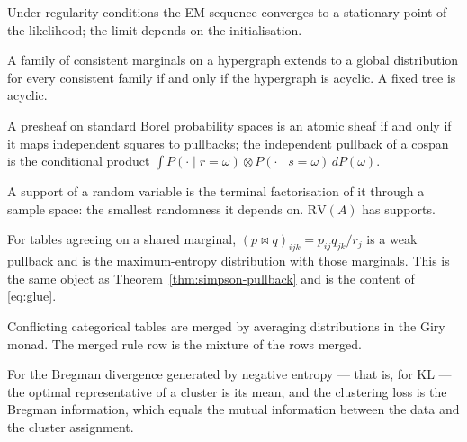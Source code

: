 \begin{theorem}
\label{thm:wu}
Under regularity conditions the EM sequence converges to a stationary point of
the likelihood; the limit depends on the initialisation.
\end{theorem}

\begin{theorem}
\label{thm:vorobev}
A family of consistent marginals on a hypergraph extends to a global
distribution for every consistent family if and only if the hypergraph is
acyclic. A fixed tree is acyclic.
\end{theorem}

\begin{theorem}
\label{thm:simpson-pullback}
A presheaf on standard Borel probability spaces is an atomic sheaf if and only
if it maps independent squares to pullbacks; the independent pullback of a
cospan is the conditional product $\int P(\cdot\mid r{=}\omega)\otimes
P(\cdot\mid s{=}\omega)\,dP(\omega)$.
\end{theorem}

\begin{definition}
\label{def:supports}
A support of a random variable is the terminal factorisation of it through a
sample space: the smallest randomness it depends on. $\mathrm{RV}(A)$ has
supports.
\end{definition}

\begin{construction}
\label{con:join}
For tables agreeing on a shared marginal, $(p\bowtie q)_{ijk} = p_{ij}q_{jk}/r_j$
is a weak pullback and is the maximum-entropy distribution with those
marginals. This is the same object as Theorem~\ref{thm:simpson-pullback} and is
the content of \eqref{eq:glue}.
\end{construction}

\begin{construction}
\label{con:merge-giry}
Conflicting categorical tables are merged by averaging distributions in the
Giry monad. The merged rule row is the mixture of the rows merged.
\end{construction}

\begin{theorem}
\label{thm:bregman}
For the Bregman divergence generated by negative entropy --- that is, for KL ---
the optimal representative of a cluster is its mean, and the clustering loss is
the Bregman information, which equals the mutual information between the data
and the cluster assignment.
\end{theorem}

